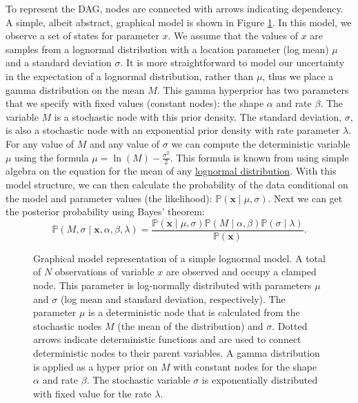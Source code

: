 To represent the DAG, nodes are connected with arrows indicating dependency. 
A simple, albeit abstract, graphical model is shown in Figure \ref{simpleGM}. 
In this model, we observe a set of states for parameter $x$. 
We assume that the values of $x$ are samples from a lognormal distribution with a location parameter (log mean) $\mu$ and a standard deviation $\sigma$. 
It is more straightforward to model our uncertainty in the expectation of a lognormal distribution, rather than $\mu$, thus we place a gamma distribution on the mean $M$. 
This gamma hyperprior has two parameters that we specify with fixed values (constant nodes): the shape $\alpha$ and rate $\beta$. 
The variable $M$ is a stochastic node with this prior density.
The standard deviation, $\sigma$, is also a stochastic node with an exponential prior density with rate parameter $\lambda$.
For any value of $M$ and any value of $\sigma$ we can compute the deterministic variable $\mu$ using the formula $\mu = \ln(M) - \frac{\sigma^2}{2}$. 
This formula is known from using simple algebra on the equation for the mean of any \href{http://en.wikipedia.org/wiki/Log-normal_distribution}{lognormal distribution}.
With this model structure, we can then calculate the probability of the data conditional on the model and parameter values (the likelihood): 
$\mathbb{P}(\boldsymbol{x} \mid \mu, \sigma)$. 
Next we can get the posterior probability using Bayes' theorem:
$$\mathbb{P}(M,\sigma \mid \boldsymbol{x}, \alpha, \beta, \lambda) = \frac{\mathbb{P}(\boldsymbol{x} \mid \mu, \sigma) \mathbb{P}(M \mid \alpha,\beta) \mathbb{P}(\sigma \mid \lambda)}{\mathbb{P}(\boldsymbol{x})}.$$
\begin{figure}[h!]
\centering
{}
\caption{\small Graphical model representation of a simple lognormal model. A total of $N$ observations of variable $x$ are observed and occupy a clamped node. 
This parameter is log-normally distributed with parameters $\mu$ and $\sigma$ (log mean and standard deviation, respectively). 
The parameter $\mu$ is a deterministic node that is calculated from the stochastic nodes $M$ (the mean of the distribution) and $\sigma$. 
Dotted arrows indicate deterministic functions and are used to connect deterministic nodes to their parent variables. 
A gamma distribution is applied as a hyper prior on $M$ with constant nodes for the shape $\alpha$ and rate $\beta$. 
The stochastic variable $\sigma$ is exponentially distributed with fixed value for the rate $\lambda$.
}
\label{simpleGM}
\end{figure}



